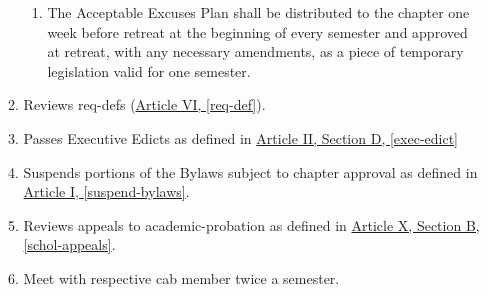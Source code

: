 \begin{enumerate}
\begin{enumerate}
\begin{enumerate}
					\item The Acceptable Excuses Plan shall be distributed to the chapter one week before retreat at the beginning of every semester and approved at retreat, with any necessary amendments, as a piece of temporary legislation valid for one semester.
				\end{enumerate}
				\item Reviews \glspl{req-def} (\hyperref[req-def]{Article VI, \autoref*{req-def}}).
				\item Passes Executive Edicts as defined in \hyperref[exec-edict]{Article II, Section D, \autoref*{exec-edict}}
				\item Suspends portions of the Bylaws subject to chapter approval as defined in \hyperref[suspend-bylaws]{Article I, \autoref*{suspend-bylaws}}.
				\item Reviews appeals to \gls{academic-probation} as defined in \hyperref[schol-appeals]{Article X, Section B, \autoref*{schol-appeals}}.
				\item Meet with respective \gls{cab} member twice a semester.
			\end{enumerate}


\end{enumerate}
